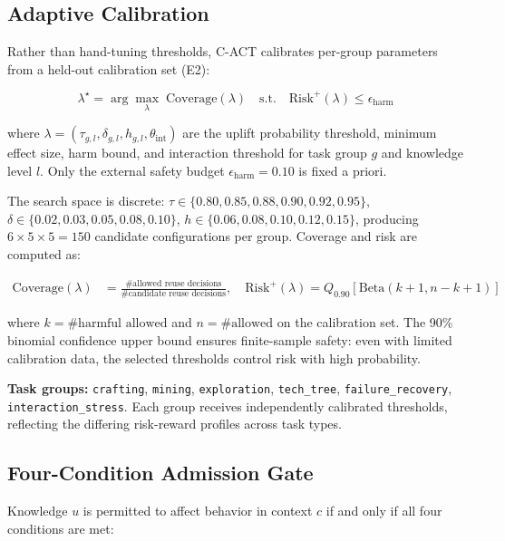 \documentclass[letterpaper]{article}
\begin{document}
\subsection{Adaptive Calibration}

Rather than hand-tuning thresholds, \textsc{C-ACT} calibrates per-group parameters from a held-out calibration set (E2):

\begin{equation}
\lambda^\star = \arg\max_{\lambda} \; \text{Coverage}(\lambda) \quad \text{s.t.} \quad \text{Risk}^+(\lambda) \leq \epsilon_{\text{harm}}
\end{equation}

where $\lambda = (\tau_{g,l}, \delta_{g,l}, h_{g,l}, \theta_{\text{int}})$ are the uplift probability threshold, minimum effect size, harm bound, and interaction threshold for task group $g$ and knowledge level $l$. Only the external safety budget $\epsilon_{\text{harm}} = 0.10$ is fixed a priori.

The search space is discrete: $\tau \in \{0.80, 0.85, 0.88, 0.90, 0.92, 0.95\}$, $\delta \in \{0.02, 0.03, 0.05, 0.08, 0.10\}$, $h \in \{0.06, 0.08, 0.10, 0.12, 0.15\}$, producing $6 \times 5 \times 5 = 150$ candidate configurations per group. Coverage and risk are computed as:

\begin{align}
\text{Coverage}(\lambda) &= \frac{\#\text{allowed reuse decisions}}{\#\text{candidate reuse decisions}}, \quad
\text{Risk}^+(\lambda) = Q_{0.90}\left[\text{Beta}\left(k+1, n-k+1\right)\right]
\end{align}

where $k = \#\text{harmful allowed}$ and $n = \#\text{allowed}$ on the calibration set. The 90\% binomial confidence upper bound ensures finite-sample safety: even with limited calibration data, the selected thresholds control risk with high probability.

\textbf{Task groups:} \texttt{crafting}, \texttt{mining}, \texttt{exploration}, \texttt{tech\_tree}, \texttt{failure\_recovery}, \texttt{interaction\_stress}. Each group receives independently calibrated thresholds, reflecting the differing risk-reward profiles across task types.

\subsection{Four-Condition Admission Gate}

Knowledge $u$ is permitted to affect behavior in context $c$ if and only if all four conditions are met:
\end{document}
